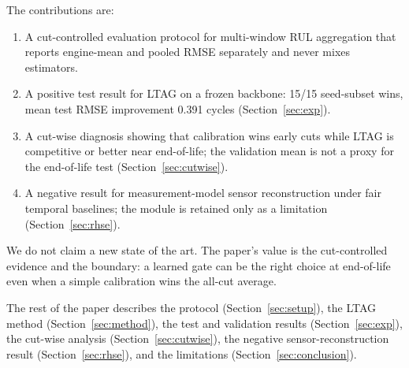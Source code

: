 The contributions are:
\begin{enumerate}
\item A cut-controlled evaluation protocol for multi-window RUL aggregation that
reports engine-mean and pooled RMSE separately and never mixes estimators.
\item A positive test result for LTAG on a frozen backbone: 15/15 seed-subset
wins, mean test RMSE improvement 0.391 cycles (Section~\ref{sec:exp}).
\item A cut-wise diagnosis showing that calibration wins early cuts while LTAG
is competitive or better near end-of-life; the validation mean is not a proxy
for the end-of-life test (Section~\ref{sec:cutwise}).
\item A negative result for measurement-model sensor reconstruction under fair
temporal baselines; the module is retained only as a limitation
(Section~\ref{sec:rhse}).
\end{enumerate}

We do not claim a new state of the art. The paper's value is the cut-controlled
evidence and the boundary: a learned gate can be the right choice at end-of-life
even when a simple calibration wins the all-cut average.

The rest of the paper describes the protocol (Section~\ref{sec:setup}), the LTAG
method (Section~\ref{sec:method}), the test and validation results
(Section~\ref{sec:exp}), the cut-wise analysis (Section~\ref{sec:cutwise}), the
negative sensor-reconstruction result (Section~\ref{sec:rhse}), and the
limitations (Section~\ref{sec:conclusion}).
